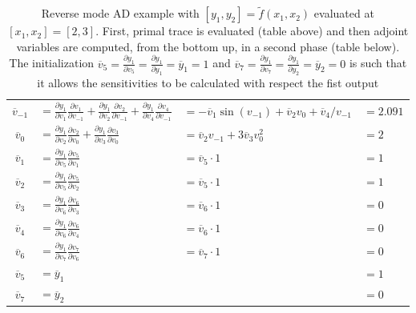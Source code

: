 \begin{table}
\begin{tabular}{clll}
		\midrule
		$\overline{v}_{-1}$  &  $=\frac{\partial y_1}{\partial v_1} \frac{\partial v_1}{\partial v_{-1}} + \frac{\partial y_1}{\partial v_2} \frac{\partial v_2}{\partial v_{-1}} + \frac{\partial y_1}{\partial v_4} \frac{\partial v_4}{\partial v_{-1}}$  &  $=-\overline{v}_1 \sin (v_{-1}) + \overline{v}_2 v_0 + \overline{v}_4/v_{-1}$  &  $=2.091$  \\
		$\overline{v}_0$	 &  $=\frac{\partial y_1}{\partial v_2} \frac{\partial v_2}{\partial v_0} + \frac{\partial y_1}{\partial v_3} \frac{\partial v_3}{\partial v_0}$  & $=\overline{v}_2 v_{-1} + 3 \overline{v}_3 v_0^2$  &  $=2$  \\
		$\overline{v}_1$	 &  $=\frac{\partial y_1}{\partial v_5} \frac{\partial v_5}{\partial v_1}$  &  $=\overline{v}_5 \cdot 1$  &  $=1$  \\
		$\overline{v}_2$	 &  $=\frac{\partial y_1}{\partial v_5} \frac{\partial v_5}{\partial v_2}$  &  $=\overline{v}_5 \cdot 1$  &  $=1$  \\
		$\overline{v}_3$	 &  $=\frac{\partial y_1}{\partial v_6} \frac{\partial v_6}{\partial v_3}$  &  $=\overline{v}_6 \cdot 1$  &  $=0$  \\
		$\overline{v}_4$	 &  $=\frac{\partial y_1}{\partial v_6} \frac{\partial v_6}{\partial v_4}$  &  $=\overline{v}_6 \cdot 1$  &  $=0$  \\
		$\overline{v}_6$	 &  $=\frac{\partial y_1}{\partial v_7} \frac{\partial v_7}{\partial v_6}$  &  $=\overline{v}_7 \cdot 1$  &  $=0$  \\
		
		\midrule
		$\overline{v}_5$  &  $=\overline{y}_1$	&  &  $=1$	\\
		$\overline{v}_7$  &  $=\overline{y}_2$  &  &  $=0$	\\
		\bottomrule
	\end{tabular}
	\caption {Reverse mode AD example with $[y_1, y_2] = \tilde{f}(x_1, x_2)$ evaluated at $[x_1, x_2] = [2,3]$. First, primal trace is evaluated (table above) and then adjoint variables are computed, from the  bottom up, in a second phase (table below). The initialization $\overline{v}_5 = \frac{\partial y_1}{\partial v_5} = \frac{\partial y_1}{\partial y_1} = \overline{y}_1 = 1$ and $\overline{v}_7 = \frac{\partial y_1}{\partial v_7} = \frac{\partial y_1}{\partial y_2} = \overline{y}_2 = 0$ is such that it allows the sensitivities to be calculated with respect the fist output}
	\label{tab:reverse_AD_example}
\end{table}


